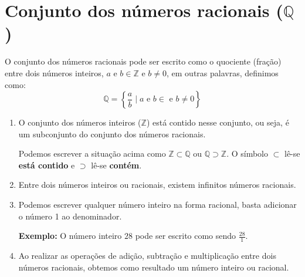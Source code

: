 \documentclass[10pt]{article}
\begin{document}
\section*{Conjunto dos números racionais (\( \mathbb{Q} \))}
O conjunto dos números racionais pode ser escrito como o quociente (fração) entre dois números inteiros, \( a \) e \(  b \in \mathbb{Z} \) e \( b \neq 0 \), em outras palavras, definimos como:
\[ \mathbb{Q} = \left\{ \frac{a}{b} \mid  a \textrm{ e } b \in \textrm{ e } b \neq 0 \right\} \]

\begin{enumerate}[label=\textbf{(\Roman*)}]
        \item O conjunto dos números inteiros (\(\mathbb{Z}\)) está contido nesse conjunto, ou seja, é um subconjunto do conjunto dos números racionais.
        \begin{obs}
        Podemos escrever a situação acima como \( \mathbb{Z} \subset \mathbb{Q} \) ou \( \mathbb{Q} \supset \mathbb{Z} \). O símbolo \( \subset \) lê-se \textbf{está contido} e \( \supset \) lê-se \textbf{contém}.
        \end{obs}
        \item Entre dois números inteiros ou racionais, existem infinitos números racionais.
        \item Podemos escrever qualquer número inteiro na forma racional, basta adicionar o número 1 ao denominador.
        
        \textbf{Exemplo:} O número inteiro \( 28 \) pode ser escrito como sendo \( \frac{28}{1} \).
        \item  Ao realizar as operações de adição, subtração e multiplicação entre dois números racionais, obtemos como resultado um número inteiro ou racional.
\end{enumerate}
\newpage
\end{document}
